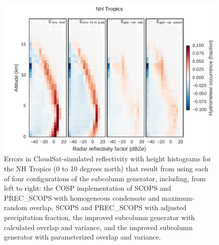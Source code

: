 \begin{figure}[htbp]
\centering
\includegraphics{graphics/subgrid2_cfadDbze94_NHTropics_all_diff.pdf}
\caption{\label{fig:cfadTropicsAllDiff}Errors in CloudSat-simulated
reflectivity with height histograms for the NH Tropics (0 to 10 degrees
north) that result from using each of four configurations of the
subcolumn generator, including, from left to right: the COSP
implementation of SCOPS and PREC\_SCOPS with homogeneous condensate and
maximum-random overlap, SCOPS and PREC\_SCOPS with adjusted
precipitation fraction, the improved subcolumn generator with calculated
overlap and variance, and the improved subcolumn generator with
parameterized overlap and variance.}\label{fig:cfadTropicsAllDiff}
\end{figure}

